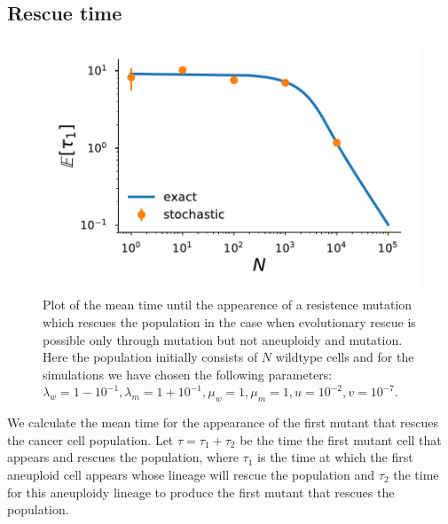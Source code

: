 \documentclass[12pt]{extarticle}
\begin{document}
\subsection*{Rescue time}
\begin{figure}[!t]
 \vspace*{1\baselineskip}
\includegraphics[width=1\textwidth]{Figures/MeanTimeGrowthAneuploidyPlot.pdf}
\caption{Plot of the mean time until the appearence of a resistence mutation which rescues the population in the case when evolutionary rescue is possible only through mutation but not aneuploidy and mutation.  Here the population initially consists of $N$ wildtype cells and for the simulations we have chosen the following parameters: $\lambda_w=1-10^{-1},\lambda_m=1+10^{-1},\mu_w=1,\mu_m=1,u=10^{-2},v=10^{-7}$.}
\label{MeanTimeGrowthAneuploidyPlot}
\end{figure}
We calculate the mean time for the appearance of the first mutant that rescues the cancer cell population.
Let $\tau=\tau_1+\tau_2$ be the time the first mutant cell that appears and rescues the population, where $\tau_1$ is the time at which the first aneuploid cell appears whose lineage will rescue the population and $\tau_2$ the time for this aneuploidy lineage to produce the first mutant that rescues the population. 
\end{document}
